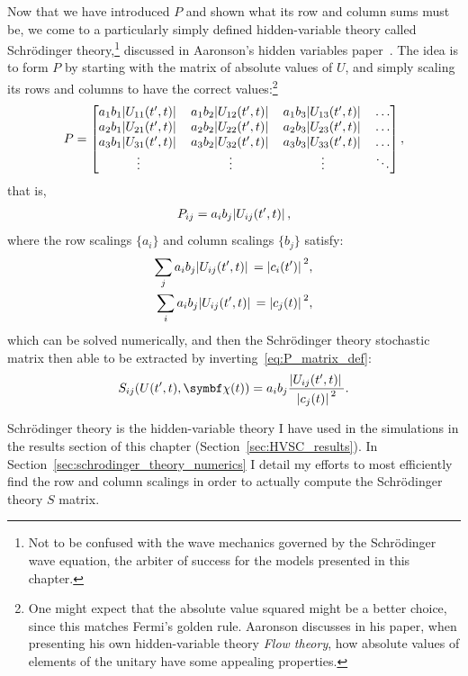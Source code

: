 Now that we have introduced $P$ and shown what its row and column sums must be, we come to a particularly simply defined hidden-variable theory called Schr\"odinger theory,\footnote{Not to be confused with the wave mechanics governed by the Schr\"odinger wave equation, the arbiter of success for the models presented in this chapter.} discussed in Aaronson's hidden variables paper~\cite{PhysRevA.71.032325}. The idea is to form $P$ by starting with the matrix of absolute values of $U$, and simply scaling its rows and columns to have the correct values:\footnote{One might expect that the absolute value squared might be a better choice, since this matches Fermi's golden rule. Aaronson discusses in his paper, when presenting his own hidden-variable theory \emph{Flow theory}, how absolute values of elements of the unitary have some appealing properties.}
\begin{align}
P = \left[\begin{matrix}
a_1b_1\abs{U_{11}(t^\prime, t)} & a_1b_2\abs{U_{12}(t^\prime, t)} & a_1b_3\abs{U_{13}(t^\prime, t)}&\hdots\\
a_2b_1\abs{U_{21}(t^\prime, t)} & a_2b_2\abs{U_{22}(t^\prime, t)} & a_2b_3\abs{U_{23}(t^\prime, t)}&\hdots\\
a_3b_1\abs{U_{31}(t^\prime, t)} & a_3b_2\abs{U_{32}(t^\prime, t)} & a_3b_3\abs{U_{33}(t^\prime, t)}&\hdots\\
\vdots & \vdots & \vdots & \ddots
\end{matrix}\right],
\end{align}
that is,
\begin{align}
P_{ij} = a_i b_j \abs{U_{ij}(t^\prime, t)},
\end{align}
where the row scalings $\{a_i\}$ and column scalings $\{b_j\}$ satisfy:
\begin{align}
\sum_j a_i b_j \abs{U_{ij}(t^\prime, t)} = \abs{c_i(t^\prime)}^2,\label{eq:a_scalings}\\
\sum_i a_i b_j \abs{U_{ij}(t^\prime, t)} = \abs{c_j(t)}^2\label{eq:b_scalings},
\end{align}
which can be solved numerically, and then the Schr\"odinger theory stochastic matrix then able to be extracted by inverting~\eqref{eq:P_matrix_def}:
\begin{align}\label{eq:schrodinger_S_matrix}
S_{ij}(U(t^\prime, t), \vec\chi(t))
= a_i b_j \frac{\abs{U_{ij}(t^\prime, t)}}{\abs{c_j(t)}^2}.
\end{align}

Schr\"odinger theory is the hidden-variable theory I have used in the simulations in the results section of this chapter (Section~\ref{sec:HVSC_results}). In Section~\ref{sec:schrodinger_theory_numerics} I detail my efforts to most efficiently find the row and column scalings in order to actually compute the Schr\"odinger theory $S$ matrix.

